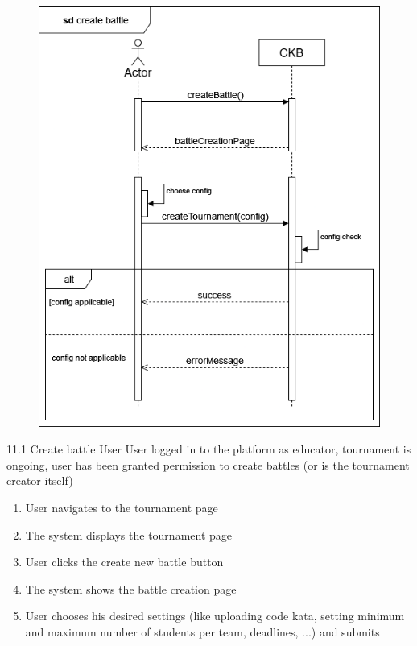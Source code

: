 \usecase
{
    \begin{figure}[H]
        \centering
        \includegraphics[width=\textwidth]{src/sequence_diagrams/createbattle.png}
    \end{figure}
}
{11.1}
{Create battle} %
{User} %
{User logged in to the platform as educator, tournament is ongoing, user has been granted permission to create battles (or is the tournament creator itself)} %
{ %
    \begin{enumerate}
        \item User navigates to the tournament page
        \item The system displays the tournament page
        \item User clicks the create new battle button
        \item The system shows the battle creation page
        \item User chooses his desired settings (like uploading code kata,            setting minimum and maximum number of students per team,                deadlines, ...) and submits
    \end{enumerate}
}
